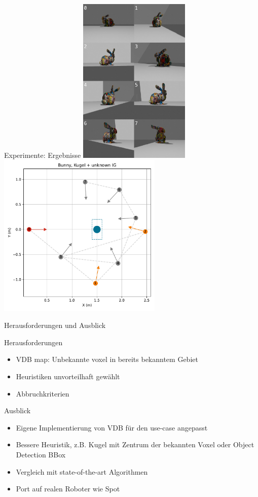\documentclass{beamer}
\begin{document}
\begin{frame}{Experimente: Ergebnisse}
	\centering
	\includegraphics[width=0.4\textwidth]{Graphics/bunny_unknown_0_collage.jpg}
	\includegraphics[width=0.59\textwidth]{Graphics/bunny_sphere_unknown_views.pdf}
\end{frame}

\begin{frame}{Herausforderungen und Ausblick}
	\begin{block}{Herausforderungen}
		\begin{itemize}
			\item VDB map: Unbekannte voxel in bereits bekanntem Gebiet
			\item Heuristiken unvorteilhaft gewählt
			\item Abbruchkriterien
		\end{itemize}

	\end{block}

	\begin{exampleblock}{Ausblick}
		\begin{itemize}
			\item Eigene Implementierung von VDB für den use-case angepasst
			\item Bessere Heuristik, z.B. Kugel mit Zentrum der bekannten Voxel oder Object Detection BBox
			\item Vergleich mit state-of-the-art Algorithmen
			\item Port auf realen Roboter wie Spot
		\end{itemize}
	\end{exampleblock}

\end{frame}
\end{document}
